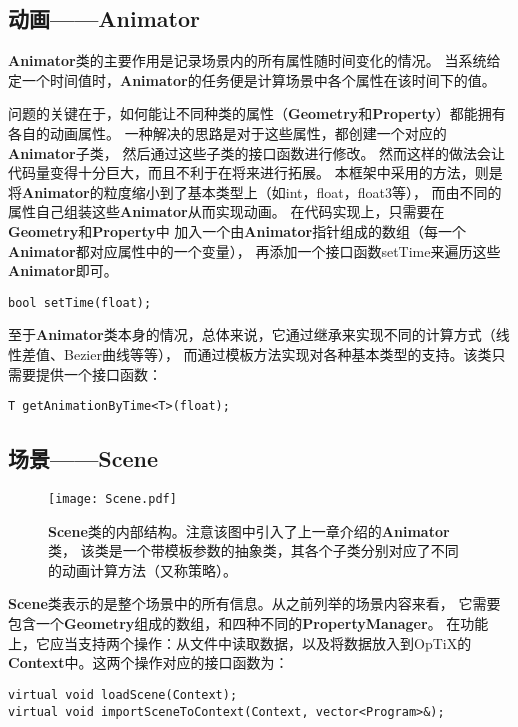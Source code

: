 \subsection{动画——Animator}

\textbf{Animator}类的主要作用是记录场景内的所有属性随时间变化的情况。
当系统给定一个时间值时，\textbf{Animator}的任务便是计算场景中各个属性在该时间下的值。

问题的关键在于，如何能让不同种类的属性（\textbf{Geometry}和\textbf{Property}）都能拥有各自的动画属性。
一种解决的思路是对于这些属性，都创建一个对应的\textbf{Animator}子类，
然后通过这些子类的接口函数进行修改。
然而这样的做法会让代码量变得十分巨大，而且不利于在将来进行拓展。
本框架中采用的方法，则是将\textbf{Animator}的粒度缩小到了基本类型上（如int，float，float3等），
而由不同的属性自己组装这些\textbf{Animator}从而实现动画。
在代码实现上，只需要在\textbf{Geometry}和\textbf{Property}中
加入一个由\textbf{Animator}指针组成的数组（每一个\textbf{Animator}都对应属性中的一个变量），
再添加一个接口函数setTime来遍历这些\textbf{Animator}即可。
\lstset{language=C++}
\begin{lstlisting}
bool setTime(float);
\end{lstlisting}

至于\textbf{Animator}类本身的情况，总体来说，它通过继承来实现不同的计算方式（线性差值、Bezier曲线等等），
而通过模板方法实现对各种基本类型的支持。该类只需要提供一个接口函数：
\lstset{language=C++}
\begin{lstlisting}
T getAnimationByTime<T>(float);
\end{lstlisting}



\subsection{场景——Scene}

\begin{figure}[h]
    \centering
    \texttt{[image: Scene.pdf]}
    \caption{\textbf{Scene}类的内部结构。注意该图中引入了上一章介绍的\textbf{Animator}类，
    该类是一个带模板参数的抽象类，其各个子类分别对应了不同的动画计算方法（又称策略）。}
    \label{tab:scene}
\end{figure}

\textbf{Scene}类表示的是整个场景中的所有信息。从之前列举的场景内容来看，
它需要包含一个\textbf{Geometry}组成的数组，和四种不同的\textbf{PropertyManager}。
在功能上，它应当支持两个操作：从文件中读取数据，以及将数据放入到OpTiX的\textbf{Context}中。这两个操作对应的接口函数为：
\lstset{language=C++}
\begin{lstlisting}
virtual void loadScene(Context);
virtual void importSceneToContext(Context, vector<Program>&);
\end{lstlisting}

